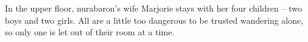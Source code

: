 \begin{multicols}{2}
In the upper floor, \gls{nurabaron}'s wife Marjorie stays with her four children -- two boys and two girls.  All are a little too dangerous to be trusted wandering alone, so only one is let out of their room at a time.


\ogre

\end{multicols}

